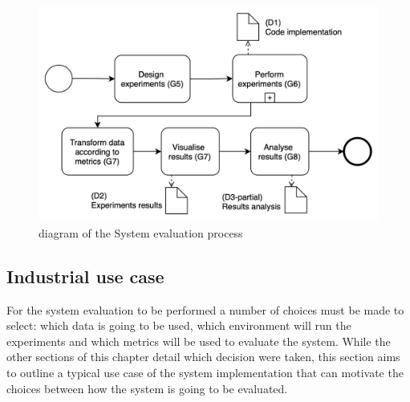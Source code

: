 \begin{figure}[!ht]
    \begin{center}
      \includegraphics[width=\textwidth]{figures/3-method/research_process_rq2.png}
    \caption{ diagram of the System evaluation process}
    \label{fig:DevProcessRQ2}
    \end{center}
\end{figure}

\subsection{Industrial use case}
\label{subsec:use_case}

For the system evaluation to be performed a number of choices must be made to select: which data is going to be used, which environment will run the experiments and which metrics will be used to evaluate the system. While the other sections of this chapter detail which decision were taken, this section aims to outline a typical use case of the system implementation that can motivate the choices between how the system is going to be evaluated.

